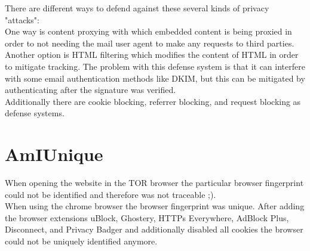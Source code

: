 \documentclass{report}
\begin{document}
		There are different ways to defend against these several kinds of privacy "attacks": \\
		One way is content proxying with which embedded content is being proxied in order to not needing the mail user agent to make any requests to third parties. \\
		Another option is HTML filtering which modifies the content of HTML in order to mitigate tracking. The problem with this defense system is that it can interfere with some email authentication methods like DKIM, but this can be mitigated by authenticating after the signature was verified. \\
		Additionally there are cookie blocking, referrer blocking, and request blocking as defense systems.
	\closesection
	
	\section{AmIUnique}
	\startsection
		When opening the website in the TOR browser the particular browser fingerprint could not be identified and therefore was not traceable ;). \\
		When using the chrome browser the browser fingerprint was unique. After adding the browser extensions uBlock, Ghostery, HTTPs Everywhere, AdBlock Plus, Disconnect, and Privacy Badger and additionally disabled all cookies the browser could not be uniquely identified anymore.
	\closesection
	
	
\end{document}
